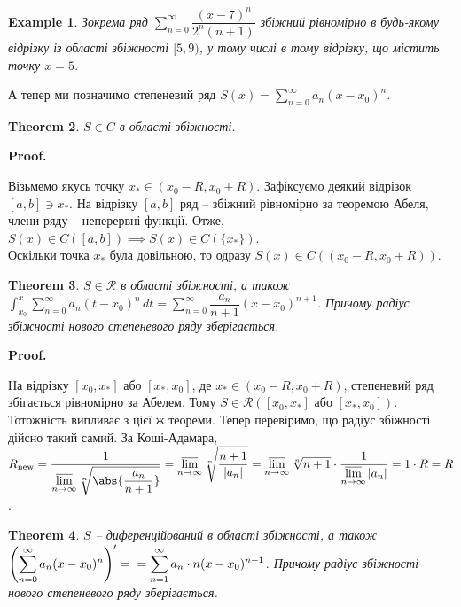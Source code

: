 \documentclass[a4paper, 10pt]{article}
\makeatletter
\DeclareMathOperator*\uplim{\overline{lim}}
\def\huge{\displaystyle}
\def\qed{$\blacksquare$}
\theoremstyle{theoremdd}
\newtheorem{theorem}{Theorem}[subsection]
\theoremstyle{theoremdd}
\theoremstyle{theoremdd}
\theoremstyle{theoremdd}
\theoremstyle{theoremdd}
\newtheorem{example}[theorem]{Example}
\theoremstyle{theoremdd}
\theoremstyle{theoremdd}
\theoremstyle{theoremdd}
\theoremstyle{theoremdd}
\renewenvironment{proof}[1][Proof.\\]{\par
\pushQED{\hfill \qed}%
\normalfont \topsep6\p@\@plus6\p@\relax
\trivlist
\item\relax
{\bfseries
#1\@addpunct{.}}\hspace\labelsep\ignorespaces
}{%
\popQED\endtrivlist\@endpefalse
}
\makeatother
\begin{document}
\begin{example}
Зокрема ряд $\huge\sum_{n=0}^\infty \dfrac{(x-7)^n}{2^n (n+1)}$ збіжний рівномірно в будь-якому відрізку із області збіжності $[5,9)$, у тому числі в тому відрізку, що містить точку $x = 5$.
\end{example}

А тепер ми позначимо степеневий ряд $\huge S(x) = \sum_{n=0}^\infty a_n(x-x_0)^n$.

\begin{theorem}
$S \in C$ в області збіжності.
\end{theorem}

\begin{proof}
Візьмемо якусь точку $x_* \in (x_0-R,x_0+R)$. Зафіксуємо деякий відрізок $[a,b] \ni x_*$. На відрізку $[a,b]$ ряд -- збіжний рівномірно за теоремою Абеля, члени ряду -- неперервні функції. Отже, $S(x) \in C([a,b]) \implies S(x) \in C(\{x_*\})$.\\
Оскільки точка $x_*$ була довільною, то одразу $S(x) \in C((x_0-R, x_0+R))$.
\end{proof}

\begin{theorem}
$S \in \mathcal{R}$ в області збіжності, а також $\huge\int_{x_0}^x \huge\sum_{n=0}^\infty a_n (t-x_0)^n\,dt = \sum_{n=0}^\infty \dfrac{a_n}{n+1}(x-x_0)^{n+1}$. Причому радіус збіжності нового степеневого ряду зберігається.
\end{theorem}

\begin{proof}
На відрізку $[x_0,x_*]$ або $[x_*,x_0]$, де $x_* \in (x_0-R,x_0+R)$, степеневий ряд збігається рівномірно за Абелем. Тому $S \in \mathcal{R}([x_0,x_*] \text{ або } [x_*,x_0])$. Тотожність випливає з цієї ж теореми. Тепер перевіримо, що радіус збіжності дійсно такий самий. За Коші-Адамара,\\
$R_{\text{new}} = \huge \dfrac{1}{\huge\uplim_{n \to \infty} \sqrt[n]{\abs{\dfrac{a_n}{n+1}}} } = \uplim_{n \to \infty} \sqrt[n]{\dfrac{n+1}{|a_n|}} = \uplim_{n \to \infty} \sqrt[n]{n+1} \cdot \dfrac{1}{\huge\uplim_{n \to \infty} |a_n|} = 1 \cdot R = R$.
\end{proof}

\begin{theorem}
$S$ -- диференційований в області збіжності, а також $\huge \left( \sum_{n=0}^\infty a_n(x-x_0)^n \right)' = \\ = \sum_{n=1}^\infty a_n\cdot n(x-x_0)^{n-1}$. Причому радіус збіжності нового степеневого ряду зберігається.
\end{theorem}
\end{document}
